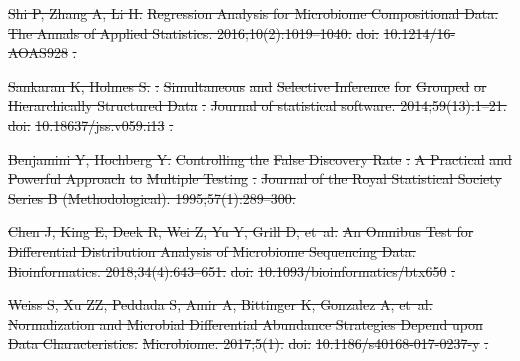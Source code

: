 \documentclass[10pt,letterpaper]{article}
\providecommand{\DIFdeltex}[1]{{\protect\color{red}\sout{#1}}}                      %
\providecommand{\DIFdel}[1]{\texorpdfstring{\DIFdeltex{#1}}{}} %
\begin{document}
\DIFdel{Shi P, Zhang A, Li H.
}%
\DIFdel{Regression Analysis for Microbiome Compositional Data.
}%
\DIFdel{The Annals of Applied Statistics. 2016;10(2):1019--1040.
}%
\DIFdel{doi:}%
\DIFdel{10.1214/16-AOAS928}%
\DIFdel{.
}%

\DIFdel{Sankaran K, Holmes S.
}%
\DIFdel{: }%
\DIFdel{Simultaneous}%
\DIFdel{and }%
\DIFdel{Selective Inference}%
\DIFdel{for
  }%
\DIFdel{Grouped}%
\DIFdel{or }%
\DIFdel{Hierarchically Structured Data}%
\DIFdel{.
}%
\DIFdel{Journal of statistical software. 2014;59(13):1--21.
}%
\DIFdel{doi:}%
\DIFdel{10.18637/jss.v059.i13}%
\DIFdel{.
}%

\DIFdel{Benjamini Y, Hochberg Y.
}%
\DIFdel{Controlling the }%
\DIFdel{False Discovery Rate}%
\DIFdel{: }%
\DIFdel{A Practical}%
\DIFdel{and
  }%
\DIFdel{Powerful Approach}%
\DIFdel{to }%
\DIFdel{Multiple Testing}%
\DIFdel{.
}%
\DIFdel{Journal of the Royal Statistical Society Series B (Methodological).
  1995;57(1):289--300.
}%

\DIFdel{Chen J, King E, Deek R, Wei Z, Yu Y, Grill D, et~al.
}%
\DIFdel{An Omnibus Test for Differential Distribution Analysis of Microbiome
  Sequencing Data.
}%
\DIFdel{Bioinformatics. 2018;34(4):643--651.
}%
\DIFdel{doi:}%
\DIFdel{10.1093/bioinformatics/btx650}%
\DIFdel{.
}%

\DIFdel{Weiss S, Xu ZZ, Peddada S, Amir A, Bittinger K, Gonzalez A, et~al.
}%
\DIFdel{Normalization and Microbial Differential Abundance Strategies Depend
  upon Data Characteristics.
}%
\DIFdel{Microbiome. 2017;5(1).
}%
\DIFdel{doi:}%
\DIFdel{10.1186/s40168-017-0237-y}%
\DIFdel{.
}%
\end{document}
